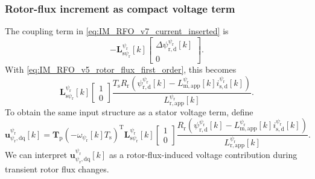 \begin{frame}
    \frametitle{Rotor-flux increment as compact voltage term}
    The coupling term in \eqref{eq:IM_RFO_v7_current_inserted} is
    \begin{equation}
        -\bm{L}^{\psi_\mathrm{r}}_{\mathrm{s}\psi_\mathrm{r}}[k]
        \begin{bmatrix}\Delta\psi^{\psi_\mathrm{r}}_{\mathrm{r},\mathrm{d}}[k]\\0\end{bmatrix}.
        \label{eq:IM_RFO_v7_psir_coupling_before_wrap}
    \end{equation}\pause%
    With \eqref{eq:IM_RFO_v5_rotor_flux_first_order}, this becomes
    \begin{equation}
        \bm{L}^{\psi_\mathrm{r}}_{\mathrm{s}\psi_\mathrm{r}}[k]
        \begin{bmatrix}1\\0\end{bmatrix}
        \frac{T_\mathrm{s}R_\mathrm{r}
            \left(\psi^{\psi_\mathrm{r}}_{\mathrm{r},\mathrm{d}}[k]-L^{\psi_\mathrm{r}}_{\mathrm{m},\mathrm{app}}[k]i^{\psi_\mathrm{r}}_{\mathrm{s},\mathrm{d}}[k]\right)}
        {L^{\psi_\mathrm{r}}_{\mathrm{r},\mathrm{app}}[k]}.
        \label{eq:IM_RFO_v7_psir_coupling_explicit}
    \end{equation}\pause%
    To obtain the same input structure as a stator voltage term, define
    \begin{equation}
        \bm{u}^{\psi_\mathrm{r}}_{\psi_\mathrm{r},\mathrm{dq}}[k]
        =\bm{T}_\mathrm{p}(-\omega_{\psi_\mathrm{r}}[k]T_\mathrm{s})^{\mathrm{T}}\bm{L}^{\psi_\mathrm{r}}_{\mathrm{s}\psi_\mathrm{r}}[k]
        \begin{bmatrix}1\\0\end{bmatrix}
        \frac{R_\mathrm{r}
            \left(\psi^{\psi_\mathrm{r}}_{\mathrm{r},\mathrm{d}}[k]-L^{\psi_\mathrm{r}}_{\mathrm{m},\mathrm{app}}[k]i^{\psi_\mathrm{r}}_{\mathrm{s},\mathrm{d}}[k]\right)}
        {L^{\psi_\mathrm{r}}_{\mathrm{r},\mathrm{app}}[k]}.
        \label{eq:IM_RFO_v7_upsi_def}
    \end{equation}
    We can interpret $\bm{u}^{\psi_\mathrm{r}}_{\psi_\mathrm{r},\mathrm{dq}}[k]$ as a rotor-flux-induced voltage contribution during transient rotor flux changes.
\end{frame}

